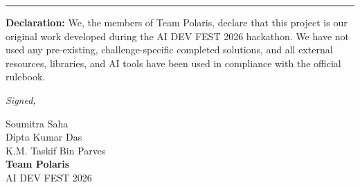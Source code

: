 \documentclass[11pt, a4paper]{article}
\begin{document}
\vspace{1cm}
\hrule
\vspace{0.5cm}
\textbf{Declaration:} We, the members of Team Polaris, declare that this project is our original work developed during the AI DEV FEST 2026 hackathon. We have not used any pre-existing, challenge-specific completed solutions, and all external resources, libraries, and AI tools have been used in compliance with the official rulebook.

\vspace{1cm}
\begin{flushright}
\textit{Signed,} \\
\vspace{0.2cm}

Soumitra Saha \\
Dipta Kumar Das \\
K.M. Taskif Bin Parves \\
\textbf{Team Polaris} \\
AI DEV FEST 2026
\end{flushright}
\end{document}
